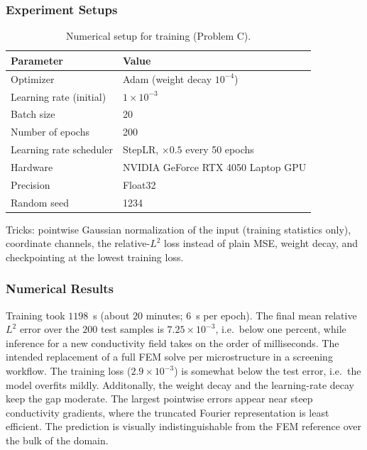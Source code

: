 \subsubsection{Experiment Setups}
%
\begin{table}[htbp]
\centering
\caption{Numerical setup for training (Problem C).}
\label{tab:problem_C_setup}
\begin{tabular}{ll}
\hline
\textbf{Parameter} & \textbf{Value} \\
\hline
Optimizer                  & Adam (weight decay $10^{-4}$) \\
Learning rate (initial)    & $1\times10^{-3}$ \\
Batch size                 & 20 \\
Number of epochs           & 200 \\
Learning rate scheduler    & StepLR, $\times 0.5$ every 50 epochs \\
Hardware                   & NVIDIA GeForce RTX 4050 Laptop GPU \\
Precision                  & Float32 \\
Random seed                & 1234 \\
\hline
\end{tabular}
\end{table}
%
Tricks: pointwise Gaussian normalization of the input (training statistics
only), coordinate channels, the relative-$L^2$ loss instead of plain MSE,
weight decay, and checkpointing at the lowest training loss.
%
\subsubsection{Numerical Results}
Training took $1198$~s (about $20$ minutes; $6$~s per epoch). The final
mean relative $L^2$ error over the $200$ test samples is
$7.25\times10^{-3}$, i.e.\ below one percent, while inference for a new
conductivity field takes on the order of milliseconds. The intended
replacement of a full FEM solve per microstructure in a screening workflow.
The training loss ($2.9\times10^{-3}$) is somewhat below the test error,
i.e.\ the model overfits mildly. Additonally, the weight decay and the learning-rate decay
keep the gap moderate. The largest pointwise errors appear near steep
conductivity gradients, where the truncated Fourier representation is least
efficient. The prediction is visually
indistinguishable from the FEM reference over the bulk of the domain.

